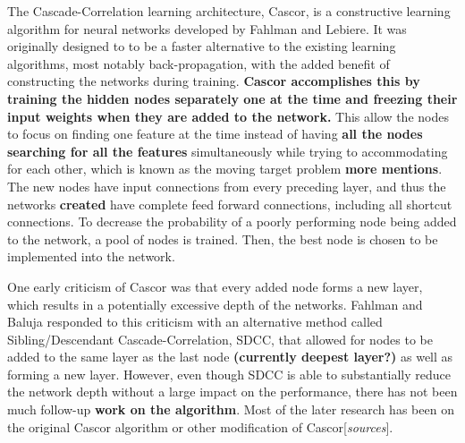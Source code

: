 \documentclass[a4paper,11pt, usenatbib]{article}
\begin{document}


The Cascade-Correlation learning architecture, Cascor, is a constructive learning algorithm for neural networks developed by Fahlman and Lebiere\cite{fahlman_cascade-correlation_1990}. It was originally designed to to be a faster alternative to the existing learning algorithms, most notably back-propagation, with the added benefit of constructing the networks during training. \textbf{Cascor accomplishes this by training the hidden nodes separately one at the time and freezing their input weights when they are added to the network.} This allow the nodes to focus on finding one feature at the time instead of having \textbf{all the nodes searching for all the features} simultaneously while trying to accommodating for each other, which is known as the moving target problem\cite{fahlman_cascade-correlation_1990} \textbf{more mentions}. The new nodes have input connections from every preceding layer, and thus the networks \textbf{created} have complete feed forward connections, including all shortcut connections. To decrease the probability of a poorly performing node being added to the network, a pool of nodes is trained. Then, the best node is chosen to be implemented into the network.

One early criticism of Cascor was that every added node forms a new layer, which results in a potentially excessive depth of the networks\cite{phatak_connectivity_1994}. Fahlman and Baluja responded to this criticism with an alternative method called Sibling/Descendant Cascade-Correlation, SDCC, that allowed for nodes to be added to the same layer as the last node \textbf{(currently deepest layer?)} as well as forming a new layer\cite{baluja_reducing_1994}. However, even though SDCC is able to substantially reduce the network depth without a large impact on the performance, there has not been much follow-up \textbf{work on the algorithm}. Most of the later research has been on the original Cascor algorithm or other modification of Cascor[\textit{sources}]. 
\end{document}
